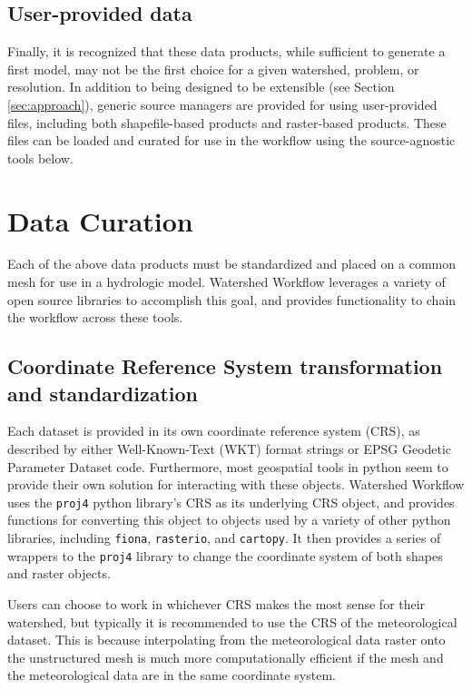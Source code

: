 \documentclass[a4paper,fleqn]{cas-dc}
\newcommand{\code}[1]{\texttt{#1}}
\begin{document}
\subsection{User-provided data}\label{ssc:acquisition:user}
%
Finally, it is recognized that these data products, while sufficient to generate a first model, may not be the first choice for a given watershed, problem, or resolution.
In addition to being designed to be extensible (see Section \ref{sec:approach}), generic source managers are provided for using user-provided files, including both shapefile-based products and raster-based products.
These files can be loaded and curated for use in the workflow using the source-agnostic tools below.

\section{Data Curation}\label{sec:data_curation}
%
Each of the above data products must be standardized and placed on a common mesh for use in a hydrologic model.
Watershed Workflow leverages a variety of open source libraries to accomplish this goal, and provides functionality to chain the workflow across these tools.

\subsection{Coordinate Reference System transformation and standardization}
%
Each dataset is provided in its own coordinate reference system (CRS), as described by either Well-Known-Text (WKT) format strings or EPSG Geodetic Parameter Dataset code.
Furthermore, most geospatial tools in python seem to provide their own solution for interacting with these objects.
Watershed Workflow uses the \code{proj4} python library's CRS as its underlying CRS object, and provides functions for converting this object to objects used by a variety of other python libraries, including \code{fiona}, \code{rasterio}, and \code{cartopy}.
It then provides a series of wrappers to the \code{proj4} library to change the coordinate system of both shapes and raster objects.

Users can choose to work in whichever CRS makes the most sense for their watershed, but typically it is recommended to use the CRS of the meteorological dataset.
This is because interpolating from the meteorological data raster onto the unstructured mesh is much more computationally efficient if the mesh and the meteorological data are in the same coordinate system.
\end{document}
